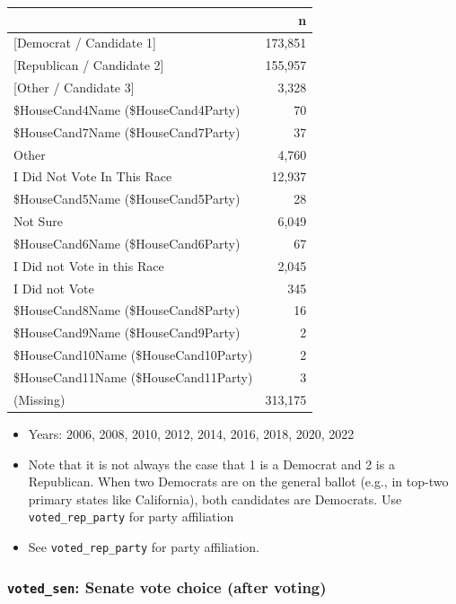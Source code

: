 \documentclass[10pt,article,oneside]{memoir}
\theoremstyle{definition}
\begin{document}
\begin{table}[H]
\centering
\begin{tabular}[t]{lr}
\toprule
 & n\\
\midrule
{}{[Democrat / Candidate 1]} & 173,851\\
{}{[Republican / Candidate 2]} & 155,957\\
{}{[Other / Candidate 3]} & 3,328\\
\$HouseCand4Name (\$HouseCand4Party) & 70\\
\$HouseCand7Name (\$HouseCand7Party) & 37\\
Other & 4,760\\
I Did Not Vote In This Race & 12,937\\
\$HouseCand5Name (\$HouseCand5Party) & 28\\
Not Sure & 6,049\\
\$HouseCand6Name (\$HouseCand6Party) & 67\\
I Did not Vote in this Race & 2,045\\
I Did not Vote & 345\\
\$HouseCand8Name (\$HouseCand8Party) & 16\\
\$HouseCand9Name (\$HouseCand9Party) & 2\\
\$HouseCand10Name (\$HouseCand10Party) & 2\\
\$HouseCand11Name (\$HouseCand11Party) & 3\\
(Missing) & 313,175\\
\bottomrule
\end{tabular}
\end{table}

\begin{itemize}
\tightlist
\item
  Years: 2006, 2008, 2010, 2012, 2014, 2016, 2018, 2020, 2022
\item
  Note that it is not always the case that 1 is a Democrat and 2 is a
  Republican. When two Democrats are on the general ballot (e.g., in
  top-two primary states like California), both candidates are
  Democrats. Use \texttt{voted\_rep\_party} for party affiliation
\item
  See \texttt{voted\_rep\_party} for party affiliation.
\end{itemize}

\subsubsection{\texorpdfstring{\texttt{voted\_sen}: Senate vote choice
(after
voting)}{voted\_sen: Senate vote choice (after voting)}}\label{voted_sen-senate-vote-choice-after-voting}
\end{document}
